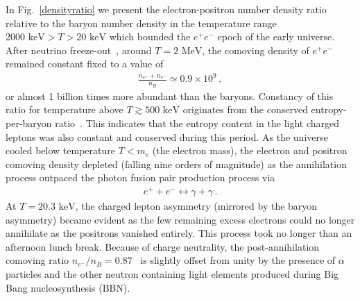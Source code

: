 \documentclass[a4paper]{article}
\newcommand*{\MeV}{\text{ MeV}}
\newcommand*{\keV}{\text{ keV}}
\newcommand{\rf}[1]{Fig.~{\ref{#1}}}
\begin{document}
\noindent In \rf{densityratio} we present the electron-positron number density ratio relative to the baryon number density in the temperature range $2000\keV>T>20\keV$ which bounded the $e^{+}e^{-}$ epoch of the early universe. After neutrino freeze-out~\cite{birrell2014relic}, around $T=2\MeV$, the comoving density of $e^{+}e^{-}$ remained constant fixed to a value of 
\begin{align}
    \label{comovingdensity}
    \frac{n_{e^{+}}+n_{e^{-}}}{n_{B}}\simeq0.9\times10^{9}\,,
\end{align}
or almost 1 billion times more abundant than the baryons. Constancy of this ratio for temperature above $T\gtrsim500\keV$ originates from the conserved entropy-per-baryon ratio~\cite{fromerth2012quarkgluon}. This indicates that the entropy content in the light charged leptons was also constant and conserved during this period. As the universe cooled below temperature $T<m_{e}$ (the electron mass), the electron and positron comoving density depleted (falling nine orders of magnitude) as the annihilation process outpaced the photon fusion pair production process via
\begin{align}
    \label{fusion}
    e^{+}+e^{-}\leftrightarrow\gamma+\gamma\,.
\end{align}
At $T=20.3\keV$, the charged lepton asymmetry (mirrored by the baryon asymmetry) became evident as the few remaining excess electrons could no longer annihilate as the positrons vanished entirely. This process took no longer than an afternoon lunch break. Because of charge neutrality, the post-annihilation comoving ratio $n_{e^{-}}/n_{B}=0.87$~\cite{rafelski2023short} is slightly offset from unity by the presence of $\alpha$ particles and the other neutron containing light elements produced during Big Bang nucleosynthesis (BBN).

\end{document}
